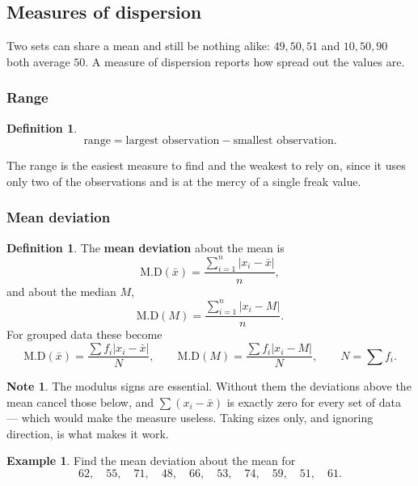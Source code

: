\documentclass[11pt,a4paper]{article}
\theoremstyle{definition}
\newtheorem{definition}[thm]{Definition}
\newtheorem{example}[thm]{Example}
\newtheorem{note}[thm]{Note}
\begin{document}
\subsection{Measures of dispersion}

Two sets can share a mean and still be nothing alike: $49,50,51$ and $10,50,90$ both
average $50$. A measure of dispersion reports how spread out the values are.

\subsubsection{Range}

\begin{definition}
$$\text{range}=\text{largest observation}-\text{smallest observation}.$$
\end{definition}

The range is the easiest measure to find and the weakest to rely on, since it uses only
two of the observations and is at the mercy of a single freak value.

\subsubsection{Mean deviation}

\begin{definition}
The \textbf{mean deviation} about the mean is
$$\text{M.D}(\bar{x})=\frac{\sum_{i=1}^{n}\left|x_i-\bar{x}\right|}{n},$$
and about the median $M$,
$$\text{M.D}(M)=\frac{\sum_{i=1}^{n}\left|x_i-M\right|}{n}.$$
For grouped data these become
$$\text{M.D}(\bar{x})=\frac{\sum f_i\left|x_i-\bar{x}\right|}{N},\qquad
\text{M.D}(M)=\frac{\sum f_i\left|x_i-M\right|}{N},\qquad N=\sum f_i.$$
\end{definition}

\begin{note}
The modulus signs are essential. Without them the deviations above the mean cancel
those below, and $\sum(x_i-\bar{x})$ is exactly zero for every set of data --- which
would make the measure useless. Taking sizes only, and ignoring direction, is what
makes it work.
\end{note}

\begin{example}
Find the mean deviation about the mean for
$$62,\quad 55,\quad 71,\quad 48,\quad 66,\quad 53,\quad 74,\quad 59,\quad 51,\quad 61.$$
\end{example}
\end{document}
